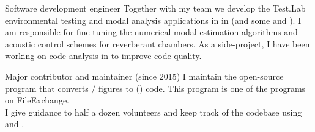 \documentclass{cv-egeerardyn}
\begin{document}
\maketitle

\begin{experience}
  {Software development engineer}%
  {\lms}%
  {%
   Together with my team we develop the Test.Lab environmental testing and modal analysis applications in  in  (and some  and ).
   I am responsible for fine-tuning the numerical modal estimation algorithms and acoustic control schemes for reverberant chambers.
   As a side-project, I have been working on code analysis in  to improve code quality.
  }

  {Major contributor and maintainer (since 2015)}%
  {\githubMatlabToTikz}{
  I maintain the open-source program  that converts / figures to  (\keyword{\LaTeX}) code.
  This program is one of the  programs on FileExchange.\\
  I give guidance to half a dozen volunteers and keep track of the codebase using  and .
  }

\end{experience}
\end{document}
